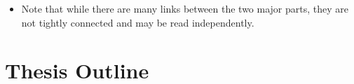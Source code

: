 \begin{notes}
\begin{itemize}
        \item Note that while there are many links between the two major parts,
              they are not tightly connected and may be read independently.

    \end{itemize}
\end{notes}

\chapter{Thesis Outline}
